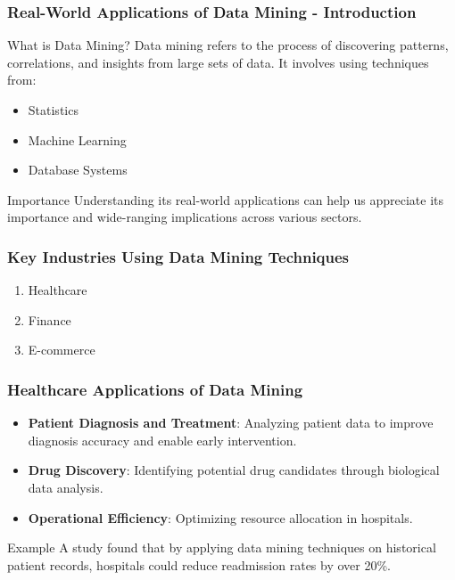 \documentclass[aspectratio=169]{beamer}
\begin{document}
\begin{frame}[fragile]
    \frametitle{Real-World Applications of Data Mining - Introduction}
    \begin{block}{What is Data Mining?}
        Data mining refers to the process of discovering patterns, correlations, and insights from large sets of data. It involves using techniques from:
        \begin{itemize}
            \item Statistics
            \item Machine Learning
            \item Database Systems
        \end{itemize}
    \end{block}
    \begin{block}{Importance}
        Understanding its real-world applications can help us appreciate its importance and wide-ranging implications across various sectors.
    \end{block}
\end{frame}

\begin{frame}[fragile]
    \frametitle{Key Industries Using Data Mining Techniques}
    \begin{enumerate}
        \item Healthcare
        \item Finance
        \item E-commerce
    \end{enumerate}
\end{frame}

\begin{frame}[fragile]
    \frametitle{Healthcare Applications of Data Mining}
    \begin{itemize}
        \item \textbf{Patient Diagnosis and Treatment}: Analyzing patient data to improve diagnosis accuracy and enable early intervention.
        \item \textbf{Drug Discovery}: Identifying potential drug candidates through biological data analysis.
        \item \textbf{Operational Efficiency}: Optimizing resource allocation in hospitals.
    \end{itemize}
    \begin{block}{Example}
        A study found that by applying data mining techniques on historical patient records, hospitals could reduce readmission rates by over 20\%.
    \end{block}
\end{frame}
\end{document}
